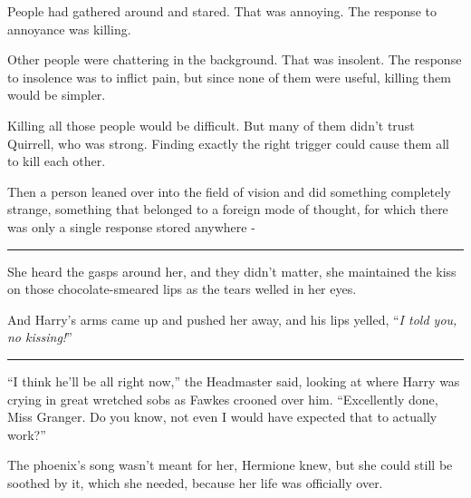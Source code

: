 People had gathered around and stared. That was annoying. The response to annoyance was killing.

Other people were chattering in the background. That was insolent. The response to insolence was to inflict pain, but since none of them were useful, killing them would be simpler.

Killing all those people would be difficult. But many of them didn't trust Quirrell, who was strong. Finding exactly the right trigger could cause them all to kill each other.

Then a person leaned over into the field of vision and did something completely strange, something that belonged to a foreign mode of thought, for which there was only a single response stored anywhere -

\begin{center}\rule{3in}{0.4pt}\end{center}

She heard the gasps around her, and they didn't matter, she maintained the kiss on those chocolate-smeared lips as the tears welled in her eyes.

And Harry's arms came up and pushed her away, and his lips yelled, ``\emph{I told you, no kissing!}''

\begin{center}\rule{3in}{0.4pt}\end{center}

``I think he'll be all right now,'' the Headmaster said, looking at where Harry was crying in great wretched sobs as Fawkes crooned over him. ``Excellently done, Miss Granger. Do you know, not even I would have expected that to actually work?''

The phoenix's song wasn't meant for her, Hermione knew, but she could still be soothed by it, which she needed, because her life was officially over.

